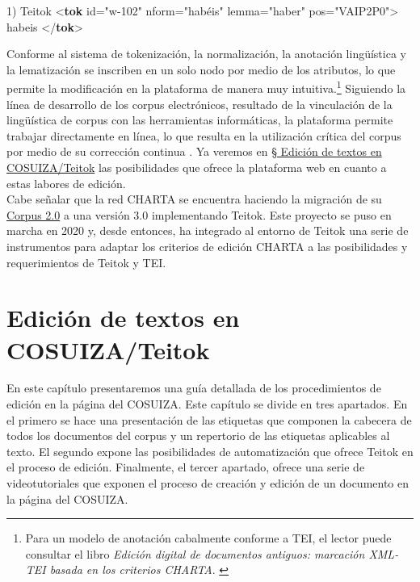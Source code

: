 \documentclass[
]{book}
\newenvironment{Shaded}{\begin{snugshade}}{\end{snugshade}}
\newcommand{\KeywordTok}[1]{\textcolor[rgb]{0.13,0.29,0.53}{\textbf{#1}}}
\newcommand{\NormalTok}[1]{#1}
\newcommand{\OtherTok}[1]{\textcolor[rgb]{0.56,0.35,0.01}{#1}}
\newcommand{\StringTok}[1]{\textcolor[rgb]{0.31,0.60,0.02}{#1}}
\begin{document}
\begin{Shaded}
\begin{Highlighting}[]
\NormalTok{1) Teitok}
\NormalTok{\textless{}}\KeywordTok{tok}\OtherTok{ id=}\StringTok{"w{-}102"}\OtherTok{ nform=}\StringTok{"habéis"}\OtherTok{ lemma=}\StringTok{"haber"}\OtherTok{ pos=}\StringTok{"VAIP2P0"}\NormalTok{\textgreater{}}
\NormalTok{habeis}
\NormalTok{\textless{}/}\KeywordTok{tok}\NormalTok{\textgreater{}}
\end{Highlighting}
\end{Shaded}

Conforme al sistema de tokenización, la normalización, la anotación lingüística y la lematización se inscriben en un solo nodo por medio de los atributos, lo que permite la modificación en la plataforma de manera muy intuitiva.\footnote{Para un modelo de anotación cabalmente conforme a TEI, el lector puede consultar el libro \emph{Edición digital de documentos antiguos: marcación XML-TEI basada en los criterios CHARTA}. \citep{martinez2020edicion}} Siguiendo la línea de desarrollo de los corpus electrónicos, resultado de la vinculación de la lingüística de corpus con las herramientas informáticas, la plataforma permite trabajar directamente en línea, lo que resulta en la utilización crítica del corpus por medio de su corrección continua \citep{kabatek2016linguistica}. Ya veremos en \protect\hyperlink{teitok}{§ Edición de textos en COSUIZA/Teitok} las posibilidades que ofrece la plataforma web en cuanto a estas labores de edición.\\
Cabe señalar que la red CHARTA se encuentra haciendo la migración de su \href{http://www.corpuscharta.es/}{Corpus 2.0} a una versión 3.0 implementando Teitok. Este proyecto se puso en marcha en 2020 y, desde entonces, ha integrado al entorno de Teitok una serie de instrumentos para adaptar los criterios de edición CHARTA a las posibilidades y requerimientos de Teitok y TEI.

\hypertarget{ediciuxf3n-de-textos-en-cosuizateitok}{%
\chapter*{Edición de textos en COSUIZA/Teitok}\label{ediciuxf3n-de-textos-en-cosuizateitok}}

En este capítulo presentaremos una guía detallada de los procedimientos de edición en la página del COSUIZA.
Este capítulo se divide en tres apartados. En el primero se hace una presentación de las etiquetas que componen la cabecera de todos los documentos del corpus y un repertorio de las etiquetas aplicables al texto. El segundo expone las posibilidades de automatización que ofrece Teitok en el proceso de edición. Finalmente, el tercer apartado, ofrece una serie de videotutoriales que exponen el proceso de creación y edición de un documento en la página del COSUIZA.
\end{document}
